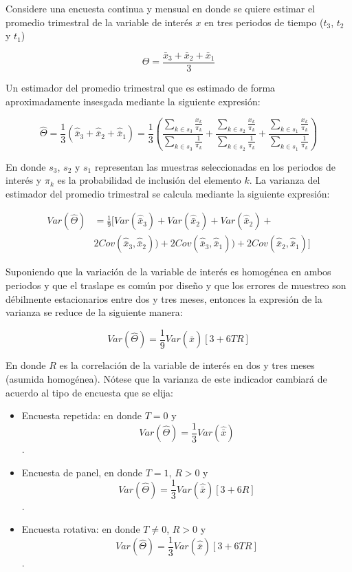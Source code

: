 \documentclass[
  10pt,
  spanish,
]{book}
\providecommand{\tightlist}{%
  \setlength{\itemsep}{0pt}\setlength{\parskip}{0pt}}
\begin{document}
Considere una encuesta continua y mensual en donde se quiere estimar el
promedio trimestral de la variable de interés \(x\) en tres periodos de
tiempo (\(t_3\), \(t_2\) y \(t_1\))

\[
\Theta = \frac{\bar{x}_3 + \bar{x}_2 + \bar{x}_1}{3}
\]

Un estimador del promedio trimestral que es estimado de forma
aproximadamente insesgada mediante la siguiente expresión:

\[
\hat{\Theta} = \frac{1}{3} \left( \hat{\bar{x}}_3 + \hat{\bar{x}}_2 + \hat{\bar{x}}_1 \right)
= \frac{1}{3}\left( \frac{\sum_{k\in s_3}\frac{x_{k}}{\pi_k}}{\sum_{k\in s_3}\frac{1}{\pi_k}} + \frac{\sum_{k\in s_2}\frac{x_{k}}{\pi_k}}{\sum_{k\in s_2}\frac{1}{\pi_k}} + \frac{\sum_{k\in s_1}\frac{x_{k}}{\pi_k}}{\sum_{k\in s_1}\frac{1}{\pi_k}} \right)
\]

En donde \(s_3\), \(s_2\) y \(s_1\) representan las muestras seleccionadas en
los periodos de interés y \(\pi_k\) es la probabilidad de inclusión del
elemento \(k\). La varianza del estimador del promedio trimestral se
calcula mediante la siguiente expresión:

\[
\begin{split}
Var(\hat{\Theta}) & = \frac{1}{9}[Var(\hat{\bar{x}}_3) + Var(\hat{\bar{x}}_2) + Var(\hat{\bar{x}}_2) + \\ 
&2Cov(\hat{\bar{x}}_3, \hat{\bar{x}}_2)) + 2Cov(\hat{\bar{x}}_3, \hat{\bar{x}}_1)) + 2Cov(\hat{\bar{x}}_2, \hat{\bar{x}}_1)]
\end{split}
\]

Suponiendo que la variación de la variable de interés es homogénea en
ambos periodos y que el traslape es común por diseño y que los errores
de muestreo son débilmente estacionarios entre dos y tres meses,
entonces la expresión de la varianza se reduce de la siguiente manera:

\[
Var(\hat{\Theta}) = \frac{1}{9} Var(\hat{\bar{x}})[3 + 6TR]
\]

En donde \(R\) es la correlación de la variable de interés en dos y tres
meses (asumida homogénea). Nótese que la varianza de este indicador
cambiará de acuerdo al tipo de encuesta que se elija:

\begin{itemize}
\tightlist
\item
  Encuesta repetida: en donde \(T=0\) y
  \[Var(\hat{\Theta}) = \frac{1}{3} Var(\hat{\bar{x}})\].
\item
  Encuesta de panel, en donde \(T=1\), \(R > 0\) y
  \[Var(\hat{\Theta}) = \frac{1}{3} Var(\hat{\bar{x}}) [3+6R]\].
\item
  Encuesta rotativa: en donde \(T\neq 0\), \(R > 0\) y
  \[Var(\hat{\Theta}) = \frac{1}{3} Var(\hat{\bar{x}}) [3+6TR]\].
\end{itemize}
\end{document}
